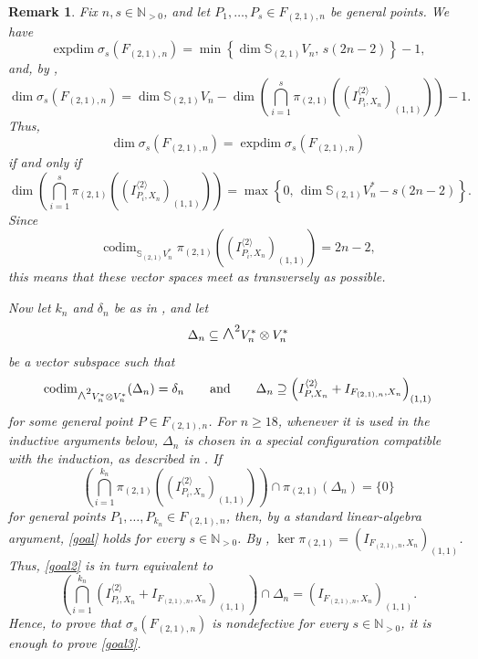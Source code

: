 \documentclass[a4paper,reqno]{amsart}
\theoremstyle{plainnopunct}
\theoremstyle{definitionnopunct}
\newtheorem{remark}[remark]{Remark}
\newcommand{\superwedge}{\mathlarger{\mathlarger{\wedge}}}
\newcommand{\N}{\mathbb{N}}
\renewcommand{\S}{\mathbb{S}}
\newcommand{\codim}{\operatorname{codim}}
\DeclareMathOperator{\expdim}{expdim}
\begin{document}
\begin{remark}
\label{rem:reduction}
Fix $n,s\in\N_{>0}$,
and let
$P_1,\ldots,P_s
\in
F_{(2,1),n}$ be general points. We have
\[
\expdim\sigma_s(F_{(2,1),n})
=
\min
\left\{
\dim\S_{(2,1)}V_n,\,
s(2n-2)
\right\}
-1,
\]
and, by ,
\[
\dim\sigma_s(F_{(2,1),n})
=
\dim\S_{(2,1)}V_n
-
\dim
\left(
\bigcap_{i=1}^s
\pi_{(2,1)}
\left(
\left(
I_{P_i,X_n}^{\langle2\rangle}
\right)_{(1,1)}
\right)
\right)
-1.
\]
Thus,
\[
\dim\sigma_s(F_{(2,1),n})
=
\expdim\sigma_s(F_{(2,1),n})
\]
if and only if
\begin{equation}
\label{goal}
\dim
\left(
\bigcap_{i=1}^s
\pi_{(2,1)}
\left(
\left(
I_{P_i,X_n}^{\langle2\rangle}
\right)_{(1,1)}
\right)
\right)
=
\max
\left\{
0,\,
\dim\S_{(2,1)}V_n^*
-
s(2n-2)
\right\}.
\end{equation}
Since
\[
\codim_{\S_{(2,1)}V_n^*}
\pi_{(2,1)}
\left(
\left(
I_{P_i,X_n}^{\langle2\rangle}
\right)_{(1,1)}
\right)
=
2n-2,
\]
this means that these vector spaces meet as transversely as possible.

Now let $k_n$ and $\delta_n$ be as in
, and let
\[
\Delta_n
\subseteq
\superwedge^2V_n^*\otimes V_n^*
\]
be a vector subspace such that
\[
\codim_{\superwedge^2V_n^*\otimes V_n^*}(\Delta_n)
=
\delta_n
\qquad
\text{and}
\qquad
\Delta_n
\supseteq
\left(
I_{P,X_n}^{\langle2\rangle}
+
I_{F_{(2,1),n},X_n}
\right)_{(1,1)}
\]
for some general point $
P\in F_{(2,1),n}$.
For $n\geq18$, whenever it is used in the inductive arguments
below, $\Delta_n$ is chosen in a special configuration compatible
with the induction, as described in . If
\begin{equation}
\label{goal2}
\left(
\bigcap_{i=1}^{k_n}
\pi_{(2,1)}
\left(
\left(
I_{P_i,X_n}^{\langle2\rangle}
\right)_{(1,1)}
\right)
\right)
\cap
\pi_{(2,1)}(\Delta_n)
=
\{0\}
\end{equation}
for general points
$
P_1,\ldots,P_{k_n}
\in
F_{(2,1),n}$,
then, by a standard linear-algebra argument,
\eqref{goal} holds for every $s\in\N_{>0}$.
By
,
$
\ker\pi_{(2,1)}
=
\left(
I_{F_{(2,1),n},X_n}
\right)_{(1,1)}$.
Thus, \eqref{goal2} is in turn equivalent to
\begin{equation}
\label{goal3}
\left(
\bigcap_{i=1}^{k_n}
\left(
I_{P_i,X_n}^{\langle2\rangle}
+
I_{F_{(2,1),n},X_n}
\right)_{(1,1)}
\right)
\cap
\Delta_n
=
\left(
I_{F_{(2,1),n},X_n}
\right)_{(1,1)}.
\end{equation}
Hence, to prove that $
\sigma_s(F_{(2,1),n})$
is nondefective for every $s\in\N_{>0}$, it is enough to prove
\eqref{goal3}.
\end{remark}
\end{document}
